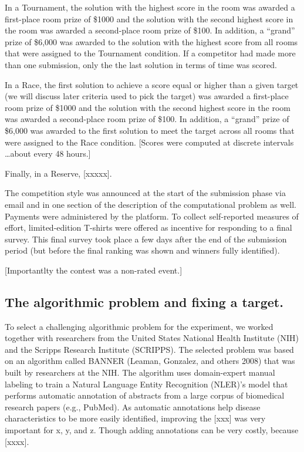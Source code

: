 \documentclass[10pt, titlepage]{article}
\begin{document}
In a Tournament, the solution with the highest score in the room was
awarded a first-place room prize of \$1000 and the solution with the
second highest score in the room was awarded a second-place room prize
of \$100. In addition, a ``grand'' prize of \$6,000 was awarded to the
solution with the highest score from all rooms that were assigned to the
Tournament condition. If a competitor had made more than one submission,
only the the last solution in terms of time was scored.

In a Race, the first solution to achieve a score equal or higher than a
given target (we will discuss later criteria used to pick the target)
was awarded a first-place room prize of \$1000 and the solution with the
second highest score in the room was awarded a second-place room prize
of \$100. In addition, a ``grand'' prize of \$6,000 was awarded to the
first solution to meet the target across all rooms that were assigned to
the Race condition. {[}Scores were computed at discrete intervals
\ldots{}about every 48 hours.{]}

Finally, in a Reserve, {[}xxxxx{]}.

The competition style was announced at the start of the submission phase
via email and in one section of the description of the computational
problem as well. Payments were administered by the platform. To collect
self-reported measures of effort, limited-edition T-shirts were offered
as incentive for responding to a final survey. This final survey took
place a few days after the end of the submission period (but before the
final ranking was shown and winners fully identified).

{[}Importantlty the contest was a non-rated event.{]}

\subsection{The algorithmic problem and fixing a
target.}\label{the-algorithmic-problem-and-fixing-a-target.}

To select a challenging algorithmic problem for the experiment, we
worked together with researchers from the United States National Health
Institute (NIH) and the Scripps Research Institute (SCRIPPS). The
selected problem was based on an algorithm called BANNER (Leaman,
Gonzalez, and others 2008) that was built by researchers at the NIH. The
algorithm uses domain-expert manual labeling to train a Natural Language
Entity Recognition (NLER)'s model that performs automatic annotation of
abstracts from a large corpus of biomedical research papers (e.g.,
PubMed). As automatic annotations help disease characteristics to be
more easily identified, improving the {[}xxx{]} was very important for
x, y, and z. Though adding annotations can be very costly, because
{[}xxxx{]}.
\end{document}
